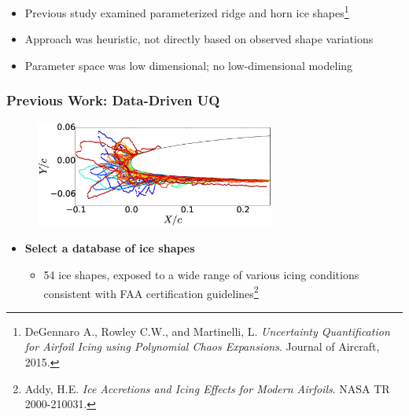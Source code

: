 \documentclass[9pt]{beamer}
\begin{document}
\begin{frame}
\begin{itemize}
\item Previous study examined parameterized ridge and horn ice
  shapes\footnote{DeGennaro A., Rowley C.W., and Martinelli,
L. \emph{Uncertainty Quantification for Airfoil Icing using Polynomial Chaos Expansions}. Journal of Aircraft, 2015.
 }
\item Approach was heuristic, not directly based on observed shape
  variations
\item Parameter space was low dimensional; no low-dimensional modeling
\end{itemize}
\end{frame}
\begin{frame}
\frametitle{Previous Work: Data-Driven UQ}
\label{sec-1-4}

\begin{figure}
  \centering
  \includegraphics[width=0.7\textwidth]{Dataset}
\end{figure}

\begin{itemize}
\item \textbf{Select a database of ice shapes}
\begin{itemize}
\item 54 ice shapes, exposed to a wide range of various icing conditions
    consistent with FAA certification guidelines\footnote{Addy, H.E. \emph{Ice Accretions and Icing Effects for Modern Airfoils}. NASA TR 2000-210031.
 }
\end{itemize}
\end{itemize}
\end{frame}
\end{document}
